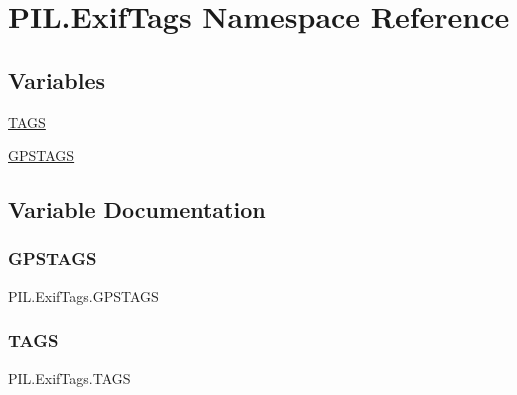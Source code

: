 \hypertarget{namespacePIL_1_1ExifTags}{}\section{P\+I\+L.\+Exif\+Tags Namespace Reference}
\label{namespacePIL_1_1ExifTags}
\subsection*{Variables}
\begin{DoxyCompactItemize}
\item 
\hyperlink{namespacePIL_1_1ExifTags_a196c791af3f50c31f6a0ed47effd3bf9}{T\+A\+GS}
\item 
\hyperlink{namespacePIL_1_1ExifTags_a7e8ab2f43f7d93e79e86ede455b2bffb}{G\+P\+S\+T\+A\+GS}
\end{DoxyCompactItemize}


\subsection{Variable Documentation}
\mbox{\label{namespacePIL_1_1ExifTags_a7e8ab2f43f7d93e79e86ede455b2bffb}} 
\subsubsection{\texorpdfstring{G\+P\+S\+T\+A\+GS}{GPSTAGS}}
{\footnotesize\ttfamily P\+I\+L.\+Exif\+Tags.\+G\+P\+S\+T\+A\+GS}

\mbox{\label{namespacePIL_1_1ExifTags_a196c791af3f50c31f6a0ed47effd3bf9}} 
\subsubsection{\texorpdfstring{T\+A\+GS}{TAGS}}
{\footnotesize\ttfamily P\+I\+L.\+Exif\+Tags.\+T\+A\+GS}

